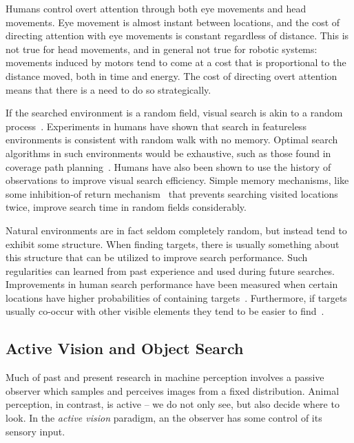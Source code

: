Humans control overt attention through both eye movements and head movements.
Eye movement is almost instant between locations, and the cost of directing attention with eye movements is constant regardless of distance.
This is not true for head movements, and in general not true for robotic systems:
movements induced by motors tend to come at a cost that is proportional to the distance moved, both in time and energy.
The cost of directing overt attention means that there is a need to do so strategically.

If the searched environment is a random field, visual search is akin to a random process~\cite{nakayama_situating_2011}.
Experiments in humans have shown that search in featureless environments is consistent with random walk with no memory.
Optimal search algorithms in such environments would be exhaustive, such as those found in coverage path planning~\cite{galceran_carreras_2013}.
Humans have also been shown to use the history of observations to improve visual search efficiency. 
Simple memory mechanisms, like some inhibition-of return mechanism~\cite{itti_koch_2001} that prevents searching visited locations twice, improve search time in random fields considerably.

Natural environments are in fact seldom completely random, but instead tend to exhibit some structure.
When finding targets, there is usually something about this structure that can be utilized to improve search performance.
Such regularities can learned from past experience and used during future searches.
Improvements in human search performance have been measured when certain locations have higher probabilities of containing targets~\cite{eckstein_visual_2011,wolfe_five_2017}.
Furthermore, if targets usually co-occur with other visible elements they tend to be easier to find~\cite{eckstein_visual_2011,wolfe_five_2017}.

\subsection{Active Vision and Object Search} 
\label{sec:activevision}

Much of past and present research in machine perception involves a passive observer which samples and perceives images from a fixed distribution.
Animal perception, in contrast, is active -- we do not only see, but also decide where to look.
In the \textit{active vision} paradigm, an the observer has some control of its sensory input.~\cite{aloimonos_active_1988}

